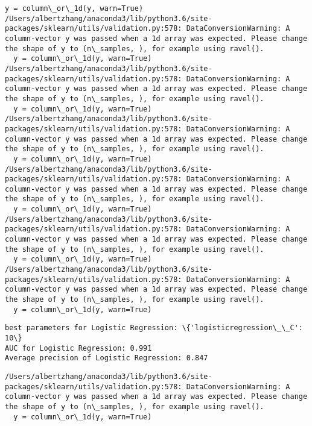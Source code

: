 \documentclass[11pt]{article}
\begin{document}
\begin{Verbatim}[commandchars=\\\{\}]
  y = column\_or\_1d(y, warn=True)
/Users/albertzhang/anaconda3/lib/python3.6/site-packages/sklearn/utils/validation.py:578: DataConversionWarning: A column-vector y was passed when a 1d array was expected. Please change the shape of y to (n\_samples, ), for example using ravel().
  y = column\_or\_1d(y, warn=True)
/Users/albertzhang/anaconda3/lib/python3.6/site-packages/sklearn/utils/validation.py:578: DataConversionWarning: A column-vector y was passed when a 1d array was expected. Please change the shape of y to (n\_samples, ), for example using ravel().
  y = column\_or\_1d(y, warn=True)
/Users/albertzhang/anaconda3/lib/python3.6/site-packages/sklearn/utils/validation.py:578: DataConversionWarning: A column-vector y was passed when a 1d array was expected. Please change the shape of y to (n\_samples, ), for example using ravel().
  y = column\_or\_1d(y, warn=True)
/Users/albertzhang/anaconda3/lib/python3.6/site-packages/sklearn/utils/validation.py:578: DataConversionWarning: A column-vector y was passed when a 1d array was expected. Please change the shape of y to (n\_samples, ), for example using ravel().
  y = column\_or\_1d(y, warn=True)
/Users/albertzhang/anaconda3/lib/python3.6/site-packages/sklearn/utils/validation.py:578: DataConversionWarning: A column-vector y was passed when a 1d array was expected. Please change the shape of y to (n\_samples, ), for example using ravel().
  y = column\_or\_1d(y, warn=True)
/Users/albertzhang/anaconda3/lib/python3.6/site-packages/sklearn/utils/validation.py:578: DataConversionWarning: A column-vector y was passed when a 1d array was expected. Please change the shape of y to (n\_samples, ), for example using ravel().
  y = column\_or\_1d(y, warn=True)

    \end{Verbatim}

    \begin{Verbatim}[commandchars=\\\{\}]
best parameters for Logistic Regression: \{'logisticregression\_\_C': 10\}
AUC for Logistic Regression: 0.991
Average precision of Logistic Regression: 0.847

    \end{Verbatim}

    \begin{Verbatim}[commandchars=\\\{\}]
/Users/albertzhang/anaconda3/lib/python3.6/site-packages/sklearn/utils/validation.py:578: DataConversionWarning: A column-vector y was passed when a 1d array was expected. Please change the shape of y to (n\_samples, ), for example using ravel().
  y = column\_or\_1d(y, warn=True)

    \end{Verbatim}
\end{document}
